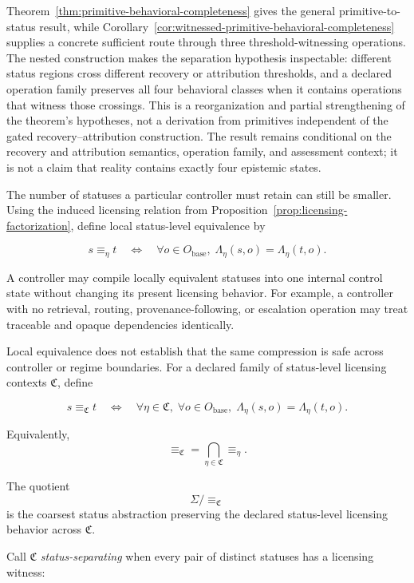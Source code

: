 \documentclass[11pt]{article}
\theoremstyle{definition}
\theoremstyle{remark}
\begin{document}
Theorem~\ref{thm:primitive-behavioral-completeness} gives the general primitive-to-status result, while Corollary~\ref{cor:witnessed-primitive-behavioral-completeness} supplies a concrete sufficient route through three threshold-witnessing operations. The nested construction makes the separation hypothesis inspectable: different status regions cross different recovery or attribution thresholds, and a declared operation family preserves all four behavioral classes when it contains operations that witness those crossings. This is a reorganization and partial strengthening of the theorem's hypotheses, not a derivation from primitives independent of the gated recovery--attribution construction. The result remains conditional on the recovery and attribution semantics, operation family, and assessment context; it is not a claim that reality contains exactly four epistemic states.

The number of statuses a particular controller must retain can still be smaller. Using the induced licensing relation from Proposition~\ref{prop:licensing-factorization}, define local status-level equivalence by

\[
s\equiv_{\eta}t
\quad\Longleftrightarrow\quad
\forall o\in O_{\mathrm{base}},
\;
\Lambda_{\eta}(s,o)=\Lambda_{\eta}(t,o).
\]

A controller may compile locally equivalent statuses into one internal control state without changing its present licensing behavior. For example, a controller with no retrieval, routing, provenance-following, or escalation operation may treat traceable and opaque dependencies identically.

Local equivalence does not establish that the same compression is safe across controller or regime boundaries. For a declared family of status-level licensing contexts \(\mathfrak C\), define

\[
s\equiv_{\mathfrak C}t
\quad\Longleftrightarrow\quad
\forall\eta\in\mathfrak C,\;
\forall o\in O_{\mathrm{base}},
\;
\Lambda_{\eta}(s,o)=\Lambda_{\eta}(t,o).
\]

Equivalently,
\[
\equiv_{\mathfrak C}
=
\bigcap_{\eta\in\mathfrak C}\equiv_{\eta}.
\]

The quotient
\[
\Sigma/{\equiv_{\mathfrak C}}
\]
is the coarsest status abstraction preserving the declared status-level licensing behavior across \(\mathfrak C\).

Call \(\mathfrak C\) \emph{status-separating} when every pair of distinct statuses has a licensing witness:
\end{document}
